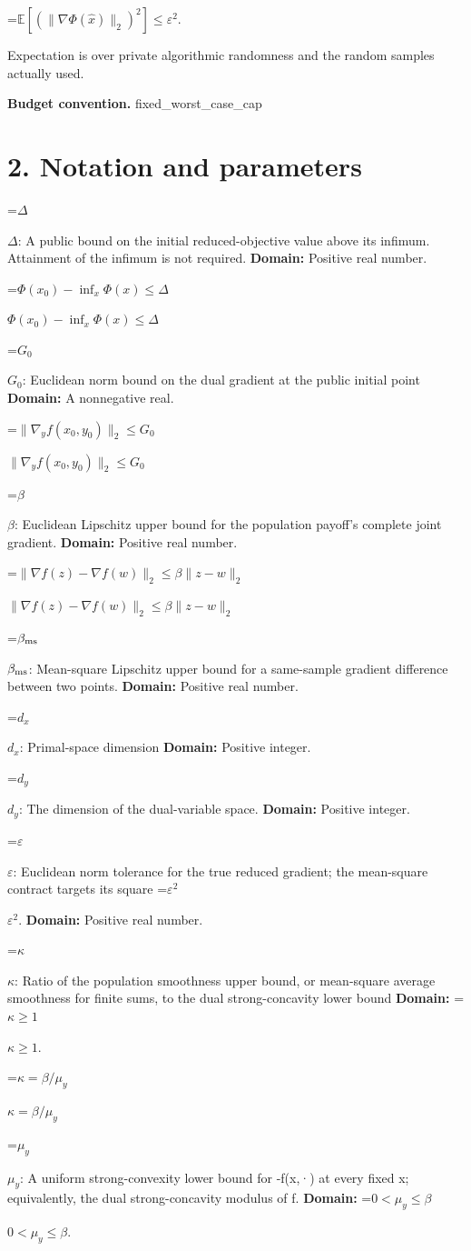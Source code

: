\documentclass[10pt,a4paper]{article}
\newcommand{\AtlasMath}[1]{\par\begingroup\centering\setbox0=\hbox{$\displaystyle #1$}\ifdim\wd0>1.4\linewidth\typeout{ATLAS WIDE FORMULA: \the\wd0}\fi\ifdim\wd0>\linewidth\resizebox{\linewidth}{!}{\box0}\else\box0\fi\par\endgroup}
\newcommand{\AtlasInlineMath}[1]{\begingroup\setbox0=\hbox{$#1$}\ifdim\wd0>.4\linewidth\endgroup\AtlasMath{#1}\else\endgroup$#1$\fi}
\begin{document}
\AtlasMath{\mathbb{E}\!\left[\left(\|\nabla\Phi(\widehat{x})\|_2\right)^2\right]\le\varepsilon^2.}


Expectation is over private algorithmic randomness and the random samples actually used.

\textbf{Budget convention.} fixed\_worst\_case\_cap

\section{2. Notation and parameters}
\AtlasInlineMath{\Delta}: A public bound on the initial reduced-objective value above its infimum. Attainment of the infimum is not required. \textbf{Domain:} Positive real number.

\AtlasInlineMath{\Phi(x_0)-\inf_x\Phi(x)\le\Delta}

\AtlasInlineMath{G_0}: Euclidean norm bound on the dual gradient at the public initial point \textbf{Domain:} A nonnegative real.

\AtlasInlineMath{\|\nabla_yf(x_0,y_0)\|_2\le G_0}

\AtlasInlineMath{\beta}: Euclidean Lipschitz upper bound for the population payoff's complete joint gradient. \textbf{Domain:} Positive real number.

\AtlasInlineMath{\|\nabla f(z)-\nabla f(w)\|_2\le\beta\|z-w\|_2}

\AtlasInlineMath{\beta_{\rm ms}}: Mean-square Lipschitz upper bound for a same-sample gradient difference between two points. \textbf{Domain:} Positive real number.

\AtlasInlineMath{d_x}: Primal-space dimension \textbf{Domain:} Positive integer.

\AtlasInlineMath{d_y}: The dimension of the dual-variable space. \textbf{Domain:} Positive integer.

\AtlasInlineMath{\varepsilon}: Euclidean norm tolerance for the true reduced gradient; the mean-square contract targets its square \AtlasInlineMath{\varepsilon^2}. \textbf{Domain:} Positive real number.

\AtlasInlineMath{\kappa}: Ratio of the population smoothness upper bound, or mean-square average smoothness for finite sums, to the dual strong-concavity lower bound \textbf{Domain:} \AtlasInlineMath{\kappa\ge1}.

\AtlasInlineMath{\kappa=\beta/\mu_y}

\AtlasInlineMath{\mu_y}: A uniform strong-convexity lower bound for -f(x,·) at every fixed x; equivalently, the dual strong-concavity modulus of f. \textbf{Domain:} \AtlasInlineMath{0<\mu_y\le\beta}.
\end{document}
